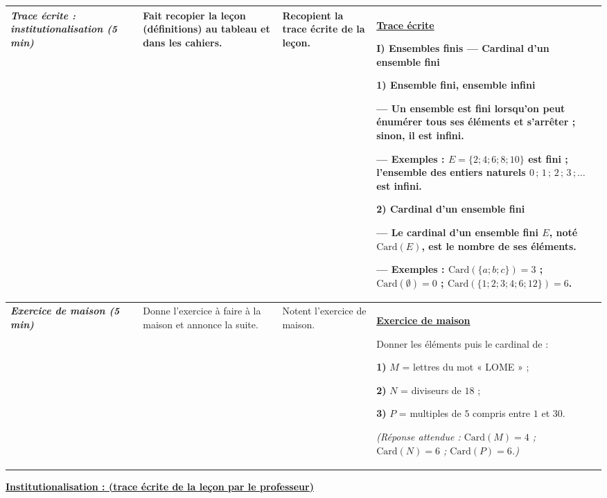 \documentclass[10pt]{article}
\newcommand{\titreR}[1]{\underline{\textcolor{rougetitre}{\bfseries #1}}}
\newcommand{\maison}{\underline{\textcolor{rougemaison}{\bfseries Exercice de maison}}}
\newcommand{\moment}[1]{\textbf{\itshape #1}}
\newcommand{\mclef}[1]{\colorbox{jaunesurl}{#1}}
\begin{document}
\begin{longtable}{|p{2.35cm}|p{5.35cm}|p{4.55cm}|p{13.85cm}|}
\moment{Trace écrite : institutionalisation (5 min)} &
Fait recopier la leçon (définitions) au tableau et dans les cahiers. &
Recopient la trace écrite de la leçon. &
\titreR{Trace écrite} \par
\textbf{I) Ensembles finis — Cardinal d'un ensemble fini} \par
\textbf{1) Ensemble fini, ensemble infini} \par
— Un ensemble est \mclef{fini} lorsqu'on peut énumérer tous ses éléments et s'arrêter ;
sinon, il est \mclef{infini}. \par
— Exemples : $E=\{2;4;6;8;10\}$ est fini ; l'ensemble des entiers naturels
$0\,;\,1\,;\,2\,;\,3\,;\dots$ est infini. \par
\textbf{2) Cardinal d'un ensemble fini} \par
— Le \mclef{cardinal} d'un ensemble fini $E$, noté $\mathrm{Card}(E)$, est le nombre
de ses éléments. \par
— Exemples : $\mathrm{Card}(\{a;b;c\})=3$ ; \; $\mathrm{Card}(\emptyset)=0$ ; \;
$\mathrm{Card}(\{1;2;3;4;6;12\})=6$. \\ \hline

\moment{Exercice de maison (5 min)} &
Donne l'exercice à faire à la maison et annonce la suite. &
Notent l'exercice de maison. &
\maison \par
Donner les éléments puis le cardinal de : \par
\textbf{1)} $M$ = lettres du mot « LOME » ; \par
\textbf{2)} $N$ = diviseurs de $18$ ; \par
\textbf{3)} $P$ = multiples de $5$ compris entre $1$ et $30$. \par
\textit{(Réponse attendue : $\mathrm{Card}(M)=4$ ; $\mathrm{Card}(N)=6$ ;
$\mathrm{Card}(P)=6$.)} \\ \hline
\end{longtable}

\begin{center}
\underline{\textcolor{rougetitre}{\large\bfseries Institutionalisation \; : \; (trace écrite de la leçon par le professeur)}}
\end{center}
\end{document}
